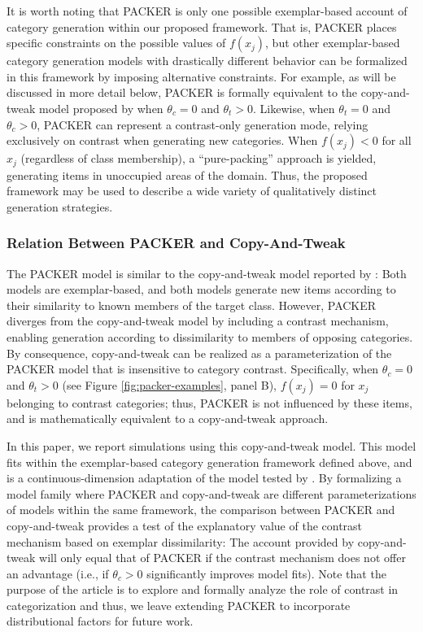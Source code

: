 \documentclass[12pt]{article}
\begin{document}
\begin{flushleft}
It is worth noting that PACKER is only one possible exemplar-based account of
category generation within our proposed framework. That is, PACKER places
specific constraints on the possible values of $f(x_j)$, but other
exemplar-based category generation models with drastically different behavior
can be formalized in this framework by imposing alternative constraints. For
example, as will be discussed in more detail below, PACKER is formally
equivalent to the copy-and-tweak model proposed by \cite{jern2013probabilistic}
when $\theta_c = 0$ and $\theta_t > 0$. Likewise, when
$\theta_t = 0$ and $\theta_c > 0$, PACKER can represent a
contrast-only generation mode, relying exclusively on contrast when generating
new categories. When $f(x_j) < 0$ for all $x_j$ (regardless of class
membership), a ``pure-packing'' approach is yielded, generating items in
unoccupied areas of the domain. Thus, the proposed framework may be used to
describe a wide variety of qualitatively distinct generation strategies.

\subsubsection{Relation Between PACKER and Copy-And-Tweak}
\label{section:copytweak-packer} The PACKER model is similar to the
copy-and-tweak model reported by \cite{jern2013probabilistic}: Both models are
exemplar-based, and both models generate new items according to their similarity
to known members of the target class. However, PACKER diverges from the
copy-and-tweak model by including a contrast mechanism, enabling generation
according to dissimilarity to members of opposing categories. By consequence,
copy-and-tweak can be realized as a parameterization of the PACKER model that is
insensitive to category contrast. Specifically, when $\theta_c = 0$ and
$\theta_t > 0$ (see Figure \ref{fig:packer-examples}, panel B),
$f(x_j) = 0$ for $x_j$ belonging to contrast categories; thus, PACKER is not
influenced by these items, and is mathematically equivalent to a copy-and-tweak
approach.

In this paper, we report simulations using this copy-and-tweak model. This model
fits within the exemplar-based category generation framework defined above, and
is a continuous-dimension adaptation of the model tested by
\cite{jern2013probabilistic}. By formalizing a model family where PACKER and
copy-and-tweak are different parameterizations of models within the same
framework, the comparison between PACKER and copy-and-tweak provides a test of
the explanatory value of the contrast mechanism based on exemplar dissimilarity:
The account provided by copy-and-tweak will only equal that of PACKER if the
contrast mechanism does not offer an advantage (i.e., if $\theta_c > 0$
significantly improves model fits). Note that the purpose of the article is to
explore and formally analyze the role of contrast in categorization and
thus, we leave extending PACKER to incorporate distributional factors \citep[as
explored by][]{jern2013probabilistic} for future work.


\end{flushleft}
\end{document}
